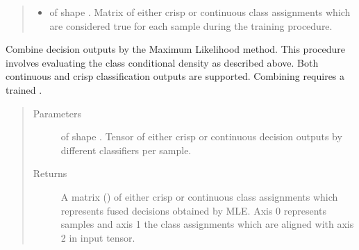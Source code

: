 \documentclass[letterpaper,10pt,english]{sphinxmanual}
\begin{document}
\begin{fulllineitems}
\begin{fulllineitems}
\begin{quote}
\begin{description}
\begin{itemize}
\item {} 
\sphinxAtStartPar
{} \textendash{}  of shape .
Matrix of either crisp or continuous class assignments which are considered true for each sample during
the training procedure.

\end{itemize}

\end{description}\end{quote}

\end{fulllineitems}


\begin{fulllineitems}
\label{\detokenize{pusion.core.maximum_likelihood_combiner:pusion.core.maximum_likelihood_combiner.MaximumLikelihoodCombiner.combine}}
\sphinxAtStartPar
Combine decision outputs by the Maximum Likelihood method. This procedure involves evaluating the class
conditional density as described above. Both continuous and crisp classification outputs are supported.
Combining requires a trained {\hyperref[\detokenize{pusion.core.maximum_likelihood_combiner:pusion.core.maximum_likelihood_combiner.MaximumLikelihoodCombiner}]{}}.
\begin{quote}\begin{description}
\item[{Parameters}] \leavevmode
\sphinxAtStartPar
{} \textendash{}  of shape .
Tensor of either crisp or continuous decision outputs by different classifiers per sample.

\item[{Returns}] \leavevmode
\sphinxAtStartPar
A matrix () of either crisp or continuous class assignments which represents fused
decisions obtained by MLE. Axis 0 represents samples and axis 1 the class assignments which are aligned
with axis 2 in  input tensor.

\end{description}\end{quote}

\end{fulllineitems}


\end{fulllineitems}
\end{document}
